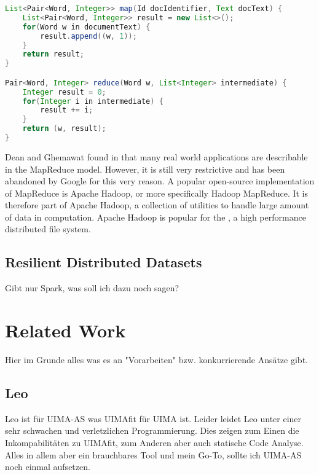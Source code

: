 \begin{lstlisting}[language=Java,caption={Example pseudocode implementation of the MapReduce model to count word occurrences.},label=lst:mapreduce]
List<Pair<Word, Integer>> map(Id docIdentifier, Text docText) {
	List<Pair<Word, Integer>> result = new List<>();
	for(Word w in documentText) {
		result.append((w, 1));
	}
	return result;
}

Pair<Word, Integer> reduce(Word w, List<Integer> intermediate) {
	Integer result = 0;
	for(Integer i in intermediate) {
		result += i;
	}
	return (w, result);
}

\end{lstlisting}
	
Dean and Ghemawat found in \cite{dean2008mapreduce} that many real world applications are describable in the MapReduce model. However, it is still very restrictive and has been abandoned by Google for this very reason. A popular open-source implementation of MapReduce is Apache Hadoop, or more specifically Hadoop MapReduce. It is therefore part of Apache Hadoop, a collection of utilities to handle large amount of data in computation. Apache Hadoop is popular for the \hdfs{}, a high performance distributed file system.

\subsection{Resilient Distributed Datasets}

Gibt nur Spark, was soll ich dazu noch sagen?

\section{Related Work}
\label{sec:related}
Hier im Grunde alles was es an "Vorarbeiten" bzw. konkurrierende Ansätze gibt.

\subsection{Leo}
\label{ssec:leo}
Leo ist für UIMA-AS was UIMAfit für UIMA ist. Leider leidet Leo unter einer sehr schwachen und verletzlichen Programmierung. Dies zeigen zum Einen die Inkompabilitäten zu UIMAfit, zum Anderen aber auch statische Code Analyse. Alles in allem aber ein brauchbares Tool und mein Go-To, sollte ich UIMA-AS noch einmal aufsetzen.

